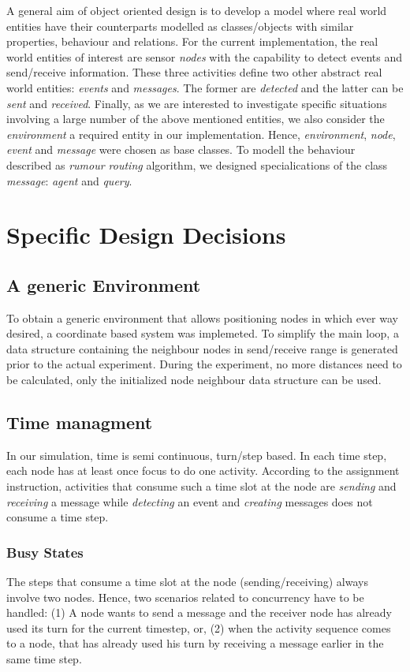\documentclass[a4paper,11pt,twoside]{article}
\begin{document}
A general aim of object oriented design is to develop a model where
real world entities have their counterparts modelled as classes/objects
with similar properties, behaviour and relations. For the current
implementation, the real world entities of interest are sensor
\textit{nodes} with the capability to detect events and send/receive
information. These three activities define two other abstract real
world entities: \textit{events} and \textit{messages}. The former are
\textit{detected} and the latter can be \textit{sent} and \textit{received}. 
Finally, as we are interested to investigate specific
situations involving a large number of the above mentioned entities,
we also consider the \textit{environment} a required entity in our
implementation. Hence, \textit{environment}, \textit{node},
\textit{event} and \textit{message} were chosen as base
classes. To modell the behaviour described as \textit{rumour routing}
algorithm, we designed specialications of the class \textit{message}:
\textit{agent} and \textit{query}.

\section{Specific Design Decisions}
\subsection{A generic Environment}
To obtain a generic environment that allows positioning nodes in which
ever way desired, a coordinate based system was implemeted. To
simplify the main loop, a data structure containing the
neighbour nodes in send/receive range is generated prior to the actual
experiment. During the experiment, no more distances need to be
calculated, only the initialized node neighbour data structure can be
used.

\subsection{Time managment}
In our simulation, time is semi continuous, turn/step based. 
In each time step, each node has at least once focus to
do one activity. According to the assignment instruction, activities
that consume such a time slot at the node are \textit{sending} and
\textit{receiving} a message while \textit{detecting} an event and
\textit{creating} messages does not consume a time step. 

\subsubsection{Busy States}
The steps that consume a time slot at the node (sending/receiving)
always involve two nodes. Hence, two scenarios related to concurrency
have to be handled: (1) A node wants to send a message and the
receiver node has already used its turn for the current timestep, or,
(2) when the activity sequence comes to a node, that has already used
his turn by receiving a message earlier in the same time step.
\end{document}
